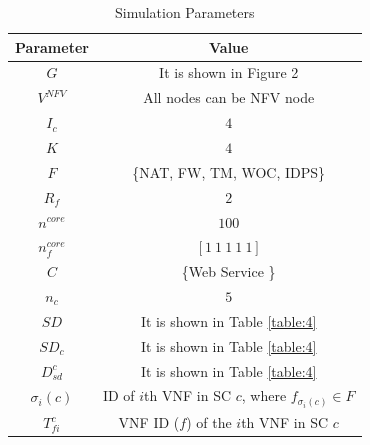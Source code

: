 \documentclass[12pt]{article}
\begin{document}
\begin{table}[t!]
\centering
\begin{tabular}{|c c|} 
 \hline
 Parameter & Value \\ [0.5ex] 
 \hline 
 $G$ &It is shown in Figure 2\\ 
 $V^{NFV}$ & All nodes can be NFV node  \\
 $I_c$ &  $4$ \\
 $K$&$4$ \\
 $F$& \{NAT, FW, TM, WOC, IDPS\} \\
 $R_f$& $2$\\
 $n^{core}$ & $100$\\
 $n^{core}_f$ & $[1 \ 1 \ 1 \ 1\ 1]$\\
 $C$& \{Web Service \} \\
 $n_c$& $5$\\
 $SD$&It is shown in Table \ref{table:4}\\
 $SD_c$&It is shown in Table \ref{table:4}\\
 $D_{sd}^c$&It is shown in Table \ref{table:4}\\
 $\sigma_i (c)$& ID of $i$th VNF in SC $c$, where $f_{\sigma_i (c)} \in F$\\
 $T_{fi}^c$& VNF ID ($f$) of the $i$th VNF in SC $c$\\[1ex] 
 \hline
\end{tabular}
\caption{Simulation Parameters}
\label{table:5}
\end{table}
\end{document}
